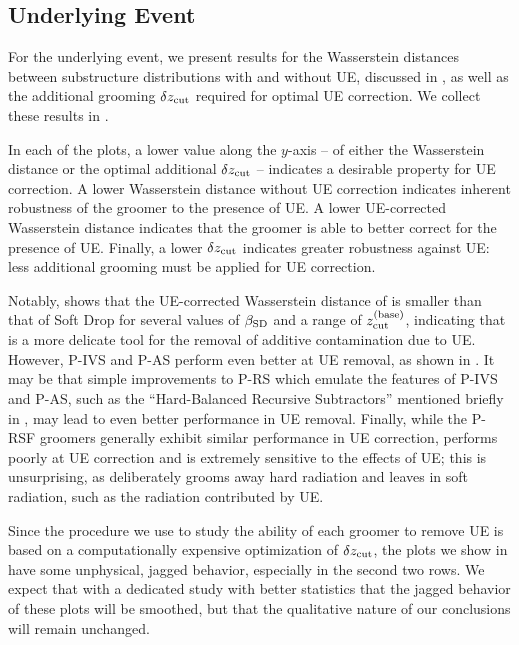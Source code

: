 \subsection{Underlying Event}
\label{app:uefrenzy}

For the underlying event, we present results for the Wasserstein distances between substructure distributions with and without UE, discussed in , as well as the additional grooming \(\delta z_{\rm cut}\) required for optimal UE correction.
%
We collect these results in .

In each of the plots, a lower value along the $y$-axis -- of either the Wasserstein distance or the optimal additional \(\delta z_{\rm cut}\) -- indicates a desirable property for UE correction.
%
A lower Wasserstein distance without UE correction indicates inherent robustness of the groomer to the presence of UE.
%
A lower UE-corrected Wasserstein distance indicates that the groomer is able to better correct for the presence of UE.
%
Finally, a lower \(\delta z_{\rm cut}\) indicates greater robustness against UE:
%
less additional grooming must be applied for UE correction.

Notably,  shows that the UE-corrected Wasserstein distance of  is smaller than that of Soft Drop for several values of \(\beta_{\rm SD}\) and a range of \(z_{\rm cut}^{\rm (base)}\), indicating that  is a more delicate tool for the removal of additive contamination due to UE.
%
However, P-IVS and P-AS perform even better at UE removal, as shown in .
%
It may be that simple improvements to P-RS which emulate the features of P-IVS and P-AS, such as the ``Hard-Balanced Recursive Subtractors'' mentioned briefly in , may lead to even better performance in UE removal.
%
Finally, while the P-RSF groomers generally exhibit similar performance in UE correction,  performs poorly at UE correction and is extremely sensitive to the effects of UE;
%
this is unsurprising, as  deliberately grooms away hard radiation and leaves in soft radiation, such as the radiation contributed by UE.

Since the procedure we use to study the ability of each groomer to remove UE is based on a computationally expensive optimization of \(\delta z_{\rm cut}\), the plots we show in  have some unphysical, jagged behavior, especially in the second two rows.
%
We expect that with a dedicated study with better statistics that the jagged behavior of these plots will be smoothed, but that the qualitative nature of our conclusions will remain unchanged.


